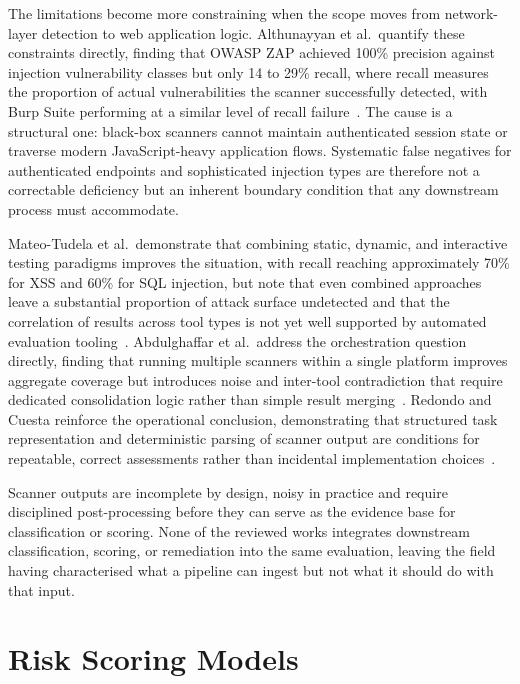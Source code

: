 \documentclass[12pt, a4paper, oneside]{report}
\begin{document}
The limitations become more constraining when the scope moves from
network-layer detection to web application logic. Althunayyan et al.\
quantify these constraints directly, finding that OWASP ZAP achieved
100\% precision against injection vulnerability classes but only 14 to
29\% recall, where recall measures the proportion of actual
vulnerabilities the scanner successfully detected, with Burp Suite
performing at a similar level of recall
failure~\cite{althunayyan2022}. The cause is a structural one: black-box
scanners cannot maintain authenticated session state or traverse modern
JavaScript-heavy application flows. Systematic false negatives for
authenticated endpoints and sophisticated injection types are therefore
not a correctable deficiency but an inherent boundary condition that any
downstream process must accommodate.

Mateo-Tudela et al.\ demonstrate that combining static, dynamic, and
interactive testing paradigms improves the situation, with recall
reaching approximately 70\% for XSS and 60\% for SQL injection, but
note that even combined approaches leave a substantial proportion of
attack surface undetected and that the correlation of results across
tool types is not yet well supported by automated evaluation
tooling~\cite{tudela2020}. Abdulghaffar et al.\ address the
orchestration question directly, finding that running multiple scanners
within a single platform improves aggregate coverage but introduces
noise and inter-tool contradiction that require dedicated consolidation
logic rather than simple result merging~\cite{abdulghaffar2023}.
Redondo and Cuesta reinforce the operational conclusion, demonstrating
that structured task representation and deterministic parsing of scanner
output are conditions for repeatable, correct assessments rather than
incidental implementation choices~\cite{redondo2019}.

Scanner outputs are incomplete by design, noisy in practice and require
disciplined post-processing before they can serve as the evidence base
for classification or scoring. None of the reviewed works integrates
downstream classification, scoring, or remediation into the same
evaluation, leaving the field having characterised what a pipeline can
ingest but not what it should do with that input.

\section{Risk Scoring Models}
\end{document}
